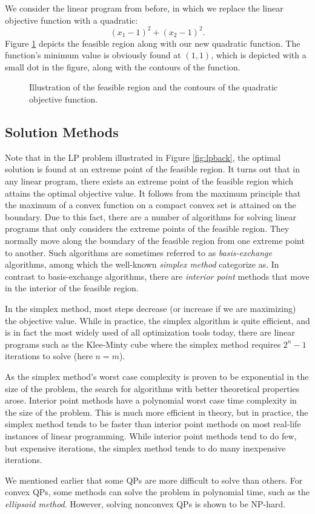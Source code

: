 We consider the linear program from before, in which we replace the linear
objective function with a quadratic:
\[
(x_1 - 1)^2 + (x_2 - 1)^2.
\]
Figure \ref{fig:qpback} depicts the feasible region along with our new
quadratic function.
The function's minimum value is obviously found at $(1,1)$, which is
depicted with a small dot in the figure, along with the contours of the
function.
\begin{figure}[ht!]
\centering

\caption{Illustration of the feasible region and the contours of the quadratic
         objective function.}
\label{fig:qpback}
\end{figure}

\subsection{Solution Methods}
Note that in the LP problem illustrated in Figure \ref{fig:lpback},
the optimal solution is found at an extreme point
of the feasible region.
It turns out that in any linear program, there exists an extreme point of the
feasible region which attains the optimal objective value.
It follows from the maximum principle that the maximum of a convex function on
a compact convex set is attained on the boundary\cite{rockafellar}.
Due to this fact, there are a number of algorithms for solving linear
programs that only considers the extreme points of the feasible region.
They normally move along the boundary of the feasible region from one extreme
point to another.
Such algorithms are sometimes referred to as \textit{basis-exchange}
algorithms, among which the well-known \textit{simplex method} categorize as.
In contrast to basis-exchange algorithms, there are \textit{interior point}
methods that move in the interior of the feasible region.

In the simplex method, most steps decrease (or increase if we are maximizing)
the objective value.
While in practice, the simplex algorithm is quite efficient, and is in fact
the most widely used of all optimization tools today\cite{nocedal}, there are
linear programs such as the Klee-Minty cube\cite{klee} where the simplex method
requires $2^n - 1$ iterations to solve (here $n = m$).

As the simplex method's worst case complexity is proven to be exponential
in the size of the problem, the search for algorithms with better theoretical
properties arose.
Interior point methods have a polynomial worst case time
complexity in the size of the problem. This is much more efficient in
theory, but in practice, the simplex method tends to be faster than interior
point methods on most real-life instances of linear programming.
While interior point methods tend
to do few, but expensive iterations, the simplex method tends to do
many inexpensive iterations.

We mentioned earlier that some QPs are more difficult to solve than others.
For convex QPs, some methods can solve the problem in polynomial time, such
as the \textit{ellipsoid method}\cite{kozlov}. However, solving nonconvex
QPs is shown to be NP-hard\cite{sahni}.
